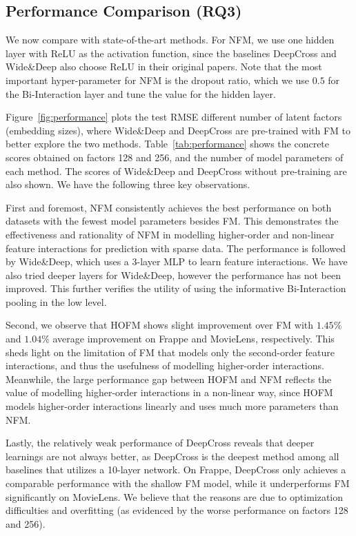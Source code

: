 \subsection{Performance Comparison (RQ3)}
\label{ss:performance_comparison}
We now compare with state-of-the-art methods. 
For NFM, we use one hidden layer with ReLU as the activation function, since the baselines DeepCross and Wide\&Deep also choose ReLU in their original papers. Note that the most important hyper-parameter for NFM is the dropout ratio, which we use $0.5$ for the Bi-Interaction layer and tune the value for the hidden layer. 

Figure~\ref{fig:performance} plots the test RMSE \wrt different number of latent factors (\ie embedding sizes), where Wide\&Deep and DeepCross are pre-trained with FM to better explore the two methods. 
Table~\ref{tab:performance} shows the concrete scores obtained on factors 128 and 256, and the number of model parameters of each method. The scores of Wide\&Deep and DeepCross without pre-training are also shown. We have the following three key observations. 

First and foremost, NFM consistently achieves the best performance on both datasets with the fewest model parameters besides FM. This demonstrates the effectiveness and rationality of NFM in modelling higher-order and non-linear feature interactions for prediction with sparse data. 
The performance is followed by Wide\&Deep, which uses a 3-layer MLP to learn feature interactions. We have also tried deeper layers for Wide\&Deep, however the performance has not been improved. This further verifies the utility of using the informative Bi-Interaction pooling in the low level. 

Second, we observe that HOFM shows slight improvement over FM with $1.45\%$ and $1.04\%$ average improvement on Frappe and MovieLens, respectively. This sheds light on the limitation of FM that models only the second-order feature interactions, and thus the usefulness of modelling higher-order interactions. Meanwhile, the large performance gap between HOFM and NFM reflects the value of modelling higher-order interactions in a non-linear way, since HOFM models higher-order interactions linearly and uses much more parameters than NFM. 

Lastly, the relatively weak performance of DeepCross reveals that deeper learnings are not always better, as DeepCross is the deepest method among all baselines that utilizes a 10-layer network. 
On Frappe, DeepCross only achieves a comparable performance with the shallow FM model, while it underperforms FM significantly on MovieLens. 
We believe that the reasons are due to optimization difficulties and overfitting (as evidenced by the worse performance on factors 128 and 256). \\\vspace{-8pt}

